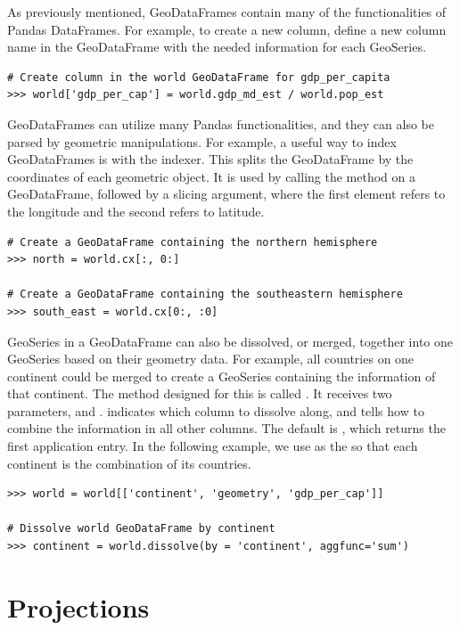 As previously mentioned, GeoDataFrames contain many of the functionalities of Pandas DataFrames.
For example, to create a new column, define a new column name in the GeoDataFrame with the needed information for each GeoSeries.

\begin{lstlisting}
# Create column in the world GeoDataFrame for gdp_per_capita
>>> world['gdp_per_cap'] = world.gdp_md_est / world.pop_est
\end{lstlisting}

GeoDataFrames can utilize many Pandas functionalities, and they can also be parsed by geometric manipulations.
For example, a useful way to index GeoDataFrames is with the  indexer.
This splits the GeoDataFrame by the coordinates of each geometric object.
It is used by calling the method  on a GeoDataFrame, followed by a slicing argument, where the first element refers to the longitude and the second refers to latitude.

\begin{lstlisting}
# Create a GeoDataFrame containing the northern hemisphere
>>> north = world.cx[:, 0:]

# Create a GeoDataFrame containing the southeastern hemisphere
>>> south_east = world.cx[0:, :0]
\end{lstlisting}

GeoSeries in a GeoDataFrame can also be dissolved, or merged, together into one GeoSeries based on their geometry data.
For example, all countries on one continent could be merged to create a GeoSeries containing the information of that continent.
The method designed for this is called .
It receives two parameters,  and .
 indicates which column to dissolve along, and  tells how to combine the information in all other columns.
The default  is , which returns the first application entry.
In the following example, we use  as the  so that each continent is the combination of its countries.

\begin{lstlisting}
>>> world = world[['continent', 'geometry', 'gdp_per_cap']]

# Dissolve world GeoDataFrame by continent
>>> continent = world.dissolve(by = 'continent', aggfunc='sum')
\end{lstlisting}


\section*{Projections} %

